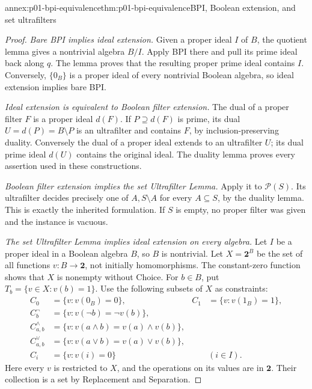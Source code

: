 \begin{annexitem}{annex:p01-bpi-equivalence}{thm:p01-bpi-equivalence}{BPI, Boolean extension, and set ultrafilters}
\begin{proof}
\emph{Bare BPI implies ideal extension.} Given a proper ideal \(I\) of
\(B\), the quotient lemma gives a nontrivial algebra \(B/I\).
Apply BPI there and pull its prime ideal back along \(q\). The lemma
proves that the resulting proper prime ideal contains \(I\).
Conversely, \(\{0_B\}\) is a proper ideal of every nontrivial
Boolean algebra, so ideal extension implies bare BPI.

\emph{Ideal extension is equivalent to Boolean filter extension.}
The dual of a proper filter \(F\) is a proper ideal \(d(F)\).
If \(P\supseteq d(F)\) is prime, its dual
\(U=d(P)=B\setminus P\) is an ultrafilter and contains \(F\),
by inclusion-preserving duality. Conversely the dual of a proper ideal
extends to an ultrafilter \(U\); its dual prime ideal \(d(U)\)
contains the original ideal. The duality lemma proves every assertion
used in these constructions.

\emph{Boolean filter extension implies the set Ultrafilter Lemma.}
Apply it to \(\mathcal P(S)\). Its ultrafilter decides precisely one
of \(A,S\setminus A\) for every \(A\subseteq S\), by the duality
lemma. This is exactly the inherited formulation. If \(S\) is empty,
no proper filter was given and the instance is vacuous.

\emph{The set Ultrafilter Lemma implies ideal extension on every algebra.}
Let \(I\) be a proper ideal in a Boolean algebra \(B\), so
\(B\) is nontrivial. Let \(X=\mathbf2^B\) be the set of all
functions \(v:B\to\mathbf2\), not initially homomorphisms.
The constant-zero function shows that \(X\) is nonempty without Choice.
For \(b\in B\), put \(T_b=\{v\in X:v(b)=1\}\).
Use the following subsets of \(X\) as constraints:
\[
\begin{aligned}
 C_0&=\{v:v(0_B)=0\},& C_1&=\{v:v(1_B)=1\},\\
 C^{\neg}_b&=\{v:v(\neg b)=\neg v(b)\},&&\\
 C^{\wedge}_{a,b}&=\{v:v(a\wedge b)=v(a)\wedge v(b)\},&&\\
 C^{\vee}_{a,b}&=\{v:v(a\vee b)=v(a)\vee v(b)\},&&\\
 C_i&=\{v:v(i)=0\}&&(i\in I).
\end{aligned}
\]
Here every \(v\) is restricted to \(X\), and the operations on its
values are in \(\mathbf2\). Their collection is a set by Replacement
and Separation.


\end{proof}
\end{annexitem}
